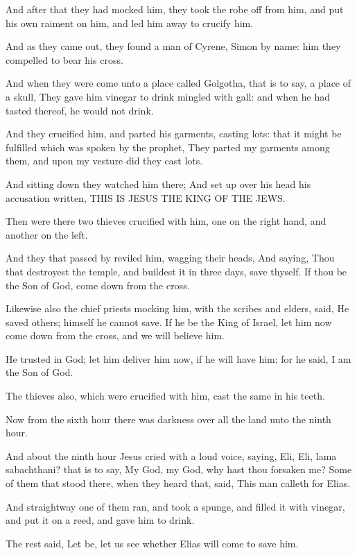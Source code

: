 \verse And after that they had mocked him, they took the robe off from him, and put his own raiment on him, and led him away to crucify him.

\verse And as they came out, they found a man of Cyrene, Simon by name: him they compelled to bear his cross.

\verse And when they were come unto a place called Golgotha, that is to say, a place of a skull, \verse They gave him vinegar to drink mingled with gall: and when he had tasted thereof, he would not drink.

\verse And they crucified him, and parted his garments, casting lots: that it might be fulfilled which was spoken by the prophet, They parted my garments among them, and upon my vesture did they cast lots.

\verse And sitting down they watched him there; \verse And set up over his head his accusation written, THIS IS JESUS THE KING OF THE JEWS.

\verse Then were there two thieves crucified with him, one on the right hand, and another on the left.

\verse And they that passed by reviled him, wagging their heads, \verse And saying, Thou that destroyest the temple, and buildest it in three days, save thyself. If thou be the Son of God, come down from the cross.

\verse Likewise also the chief priests mocking him, with the scribes and elders, said, \verse He saved others; himself he cannot save. If he be the King of Israel, let him now come down from the cross, and we will believe him.

\verse He trusted in God; let him deliver him now, if he will have him: for he said, I am the Son of God.

\verse The thieves also, which were crucified with him, cast the same in his teeth.

\verse Now from the sixth hour there was darkness over all the land unto the ninth hour.

\verse And about the ninth hour Jesus cried with a loud voice, saying, Eli, Eli, lama sabachthani? that is to say, My God, my God, why hast thou forsaken me?  \verse Some of them that stood there, when they heard that, said, This man calleth for Elias.

\verse And straightway one of them ran, and took a spunge, and filled it with vinegar, and put it on a reed, and gave him to drink.

\verse The rest said, Let be, let us see whether Elias will come to save him.

